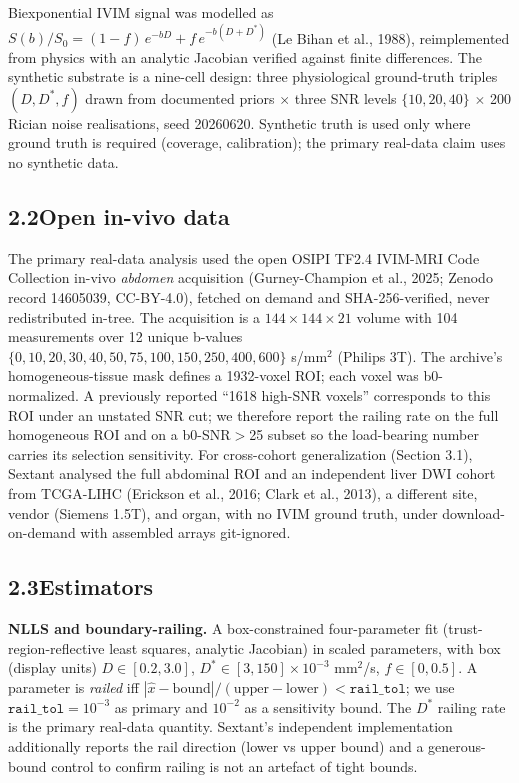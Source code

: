 \documentclass[11pt]{article}
\newcommand{\Dstar}{\ensuremath{D^{*}}}
\newcommand{\Szero}{\ensuremath{S_{0}}}
\begin{document}
Biexponential IVIM signal was modelled as
$S(b)/\Szero = (1-f)\,e^{-bD} + f\,e^{-b(D+\Dstar{})}$ (Le Bihan et al., 1988),
reimplemented from physics with an analytic Jacobian verified against finite differences.
The synthetic substrate is a nine-cell design: three physiological ground-truth triples
$(D,\Dstar{},f)$ drawn from documented priors $\times$ three SNR levels
$\{10, 20, 40\}$ $\times$ 200 Rician noise realisations, seed 20260620. Synthetic truth
is used only where ground truth is required (coverage, calibration); the primary
real-data claim uses no synthetic data.

\subsection*{2.2\quad Open in-vivo data}

The primary real-data analysis used the open OSIPI TF2.4 IVIM-MRI Code Collection
in-vivo \emph{abdomen} acquisition (Gurney-Champion et al., 2025; Zenodo record
14605039, CC-BY-4.0), fetched on demand and SHA-256-verified, never redistributed
in-tree. The acquisition is a $144\times144\times21$ volume with 104 measurements over
12 unique b-values $\{0,10,20,30,40,50,75,100,150,250,400,600\}$ s/mm$^2$ (Philips 3T).
The archive's homogeneous-tissue mask defines a 1932-voxel ROI; each voxel was
b0-normalized. A previously reported ``1618 high-SNR voxels'' corresponds to this ROI
under an unstated SNR cut; we therefore report the railing rate on the full
homogeneous ROI and on a b0-SNR$>$25 subset so the load-bearing number carries its
selection sensitivity. For cross-cohort generalization (Section 3.1), Sextant analysed
the full abdominal ROI and an independent liver DWI cohort from TCGA-LIHC (Erickson et
al., 2016; Clark et al., 2013), a different site, vendor (Siemens 1.5T), and organ, with
no IVIM ground truth, under download-on-demand with assembled arrays git-ignored.

\subsection*{2.3\quad Estimators}

\textbf{NLLS and boundary-railing.} A box-constrained four-parameter fit
(trust-region-reflective least squares, analytic Jacobian) in scaled parameters, with box
(display units) $D\in[0.2,3.0]$, $\Dstar{}\in[3,150]\times10^{-3}$ mm$^2$/s,
$f\in[0,0.5]$. A parameter is \emph{railed} iff
$|\hat{x}-\text{bound}|/(\text{upper}-\text{lower}) < \texttt{rail\_tol}$; we use
$\texttt{rail\_tol}=10^{-3}$ as primary and $10^{-2}$ as a sensitivity bound. The
\Dstar{} railing rate is the primary real-data quantity. Sextant's independent
implementation additionally reports the rail direction (lower vs upper bound) and a
generous-bound control to confirm railing is not an artefact of tight bounds.
\end{document}
